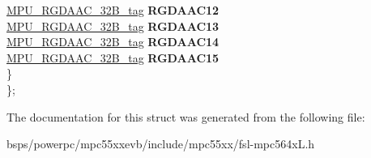 \begin{DoxyCompactItemize}
\begin{tabbing}
\>\>\mbox{\hyperlink{unionMPU__RGDAAC__32B__tag}{MPU\_RGDAAC\_32B\_tag}} {\bfseries RGDAAC12}\\
\>\>\mbox{\hyperlink{unionMPU__RGDAAC__32B__tag}{MPU\_RGDAAC\_32B\_tag}} {\bfseries RGDAAC13}\\
\>\>\mbox{\hyperlink{unionMPU__RGDAAC__32B__tag}{MPU\_RGDAAC\_32B\_tag}} {\bfseries RGDAAC14}\\
\>\>\mbox{\hyperlink{unionMPU__RGDAAC__32B__tag}{MPU\_RGDAAC\_32B\_tag}} {\bfseries RGDAAC15}\\
\>\} \\
\}; \\

\end{tabbing}\end{DoxyCompactItemize}


The documentation for this struct was generated from the following file\+:\begin{DoxyCompactItemize}
\item 
bsps/powerpc/mpc55xxevb/include/mpc55xx/fsl-\/mpc564x\+L.\+h\end{DoxyCompactItemize}
